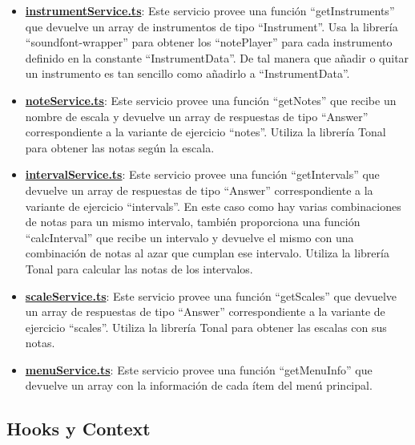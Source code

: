 \documentclass[12pt,twoside,titlepage]{report}
\begin{document}
\begin{itemize}
    \item \href{https://github.com/alberttogoca/EarFit/blob/main/src/services/instrumentService.ts}{\textbf{instrumentService.ts}}: Este servicio provee una función ``getInstruments'' que devuelve un array de instrumentos de tipo ``Instrument''. Usa la librería ``soundfont-wrapper'' para obtener los ``notePlayer'' para cada instrumento definido en la constante ``InstrumentData''. De tal manera que añadir o quitar un instrumento es tan sencillo como añadirlo a ``InstrumentData''.
    \item \href{https://github.com/alberttogoca/EarFit/blob/main/src/services/noteService.ts}{\textbf{noteService.ts}}: Este servicio provee una función ``getNotes'' que recibe un nombre de escala y devuelve un array de respuestas de tipo ``Answer'' correspondiente a la variante de ejercicio ``notes''. Utiliza la librería Tonal para obtener las notas según la escala.
    \item \href{https://github.com/alberttogoca/EarFit/blob/main/src/services/intervalService.ts}{\textbf{intervalService.ts}}: Este servicio provee una función ``getIntervals'' que devuelve un array de respuestas de tipo ``Answer'' correspondiente a la  variante de ejercicio ``intervals''. En este caso como hay varias combinaciones de notas para un mismo intervalo, también proporciona una función ``calcInterval'' que recibe un intervalo y devuelve el mismo con una combinación de notas al azar que cumplan ese intervalo. Utiliza la librería Tonal para calcular las notas de los intervalos.
    \item \href{https://github.com/alberttogoca/EarFit/blob/main/src/services/scaleService.ts}{\textbf{scaleService.ts}}: Este servicio provee una función ``getScales'' que devuelve un array de respuestas de tipo ``Answer'' correspondiente a la  variante de ejercicio ``scales''. Utiliza la librería Tonal para obtener las escalas con sus notas.
    \item \href{https://github.com/alberttogoca/EarFit/blob/main/src/services/menuService.ts}{\textbf{menuService.ts}}: Este servicio provee una función ``getMenuInfo'' que devuelve un array con la información de cada ítem del menú principal. 
\end{itemize}

\subsection{Hooks y Context}
\label{sec:Hooks}
\end{document}
